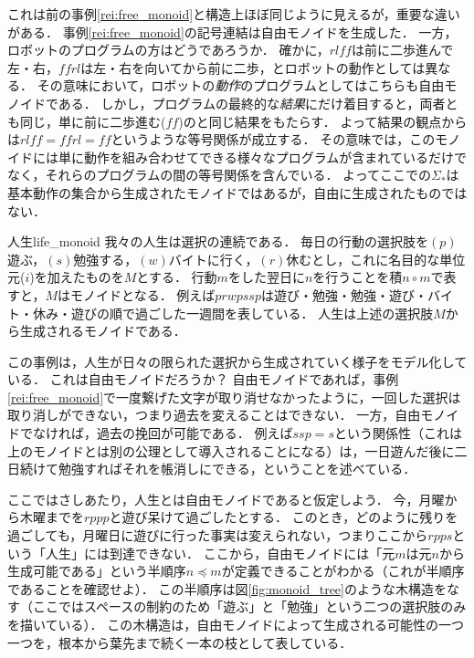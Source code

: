 \documentclass[11pt,a4paper, dvipdfmx]{jsarticle}
\begin{document}
これは前の事例\ref{rei:free_monoid}と構造上ほぼ同じように見えるが，重要な違いがある．
事例\ref{rei:free_monoid}の記号連結は自由モノイドを生成した．
一方，ロボットのプログラムの方はどうであろうか．
確かに，$rlff$は前に二歩進んで左・右，$ffrl$は左・右を向いてから前に二歩，とロボットの動作としては異なる．
その意味において，ロボットの\emph{動作}のプログラムとしてはこちらも自由モノイドである．
しかし，プログラムの最終的な\emph{結果}にだけ着目すると，両者とも同じ，単に前に二歩進む($ff$)のと同じ結果をもたらす．
よって結果の観点からは$rlff = ffrl = ff$というような等号関係が成立する．
その意味では，このモノイドには単に動作を組み合わせてできる様々なプログラムが含まれているだけでなく，それらのプログラムの間の等号関係を含んでいる．
よってここでの$\Sigma_*$は基本動作の集合から生成されたモノイドではあるが，自由に生成されたものではない．



\begin{rei}{人生}{life_monoid}
    我々の人生は選択の連続である．
    毎日の行動の選択肢を$(p)$ 遊ぶ，$(s)$勉強する，$(w)$バイトに行く，$(r)$休むとし，これに名目的な単位元($i$)を加えたものを$M$とする．
    行動$m$をした翌日に$n$を行うことを積$n \circ m$で表すと，$M$はモノイドとなる．
    例えば$prwpssp$は遊び・勉強・勉強・遊び・バイト・休み・遊びの順で過ごした一週間を表している．
    人生は上述の選択肢$M$から生成されるモノイドである．
\end{rei}

この事例は，人生が日々の限られた選択から生成されていく様子をモデル化している．
これは自由モノイドだろうか？
自由モノイドであれば，事例\ref{rei:free_monoid}で一度繋げた文字が取り消せなかったように，一回した選択は取り消しができない，つまり過去を変えることはできない．
一方，自由モノイドでなければ，過去の挽回が可能である．
例えば$ssp = s$という関係性（これは上のモノイドとは別の公理として導入されることになる）は，一日遊んだ後に二日続けて勉強すればそれを帳消しにできる，ということを述べている．

ここではさしあたり，人生とは自由モノイドであると仮定しよう．
今，月曜から木曜までを$rppp$と遊び呆けて過ごしたとする．
このとき，どのように残りを過ごしても，月曜日に遊びに行った事実は変えられない，つまりここから$rpps$という「人生」には到達できない．
ここから，自由モノイドには「元$m$は元$n$から生成可能である」という半順序$n \preceq m$が定義できることがわかる（これが半順序であることを確認せよ）．
この半順序は図\ref{fig:monoid_tree}のような木構造をなす（ここではスペースの制約のため「遊ぶ」と「勉強」という二つの選択肢のみを描いている）．
この木構造は，自由モノイドによって生成される可能性の一つ一つを，根本から葉先まで続く一本の枝として表している．
\end{document}
